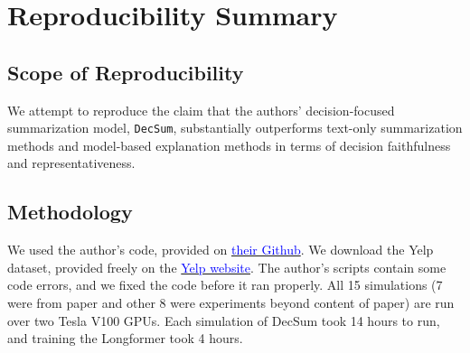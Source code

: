 \documentclass{article}
\title{}
\author{%
  Mingcheng Wang, Eric Xia, Trevor Jung\\ %
  University of Washington \\
 \texttt{\{wmingch, ericxia, tjung2\}@uw.edu} \\ %
}
\newcommand{\blue}[1]{\textcolor{blue}{#1}}
\begin{document}
\maketitle




\section*{\centering Reproducibility Summary}

\subsection*{Scope of Reproducibility}
We attempt to reproduce the claim that the authors’ decision-focused summarization model, \texttt{DecSum}, substantially outperforms text-only summarization methods and model-based
explanation methods in terms of decision faithfulness and representativeness.

\subsection*{Methodology}
We used the author’s code, provided on \href{https://github.com/ChicagoHAI/decsum}{\blue{their Github}}. We download the Yelp dataset, provided freely on the
\href{https://www.yelp.com/dataset/download}{\blue{Yelp website}}. The author's scripts contain some code errors, and we fixed the code before it ran properly. All 15 simulations (7 were from paper
and other 8 were experiments beyond content of paper) are run over two Tesla V100 GPUs. Each simulation of DecSum took 14 hours to run, and training the Longformer took 4 hours.
\end{document}

